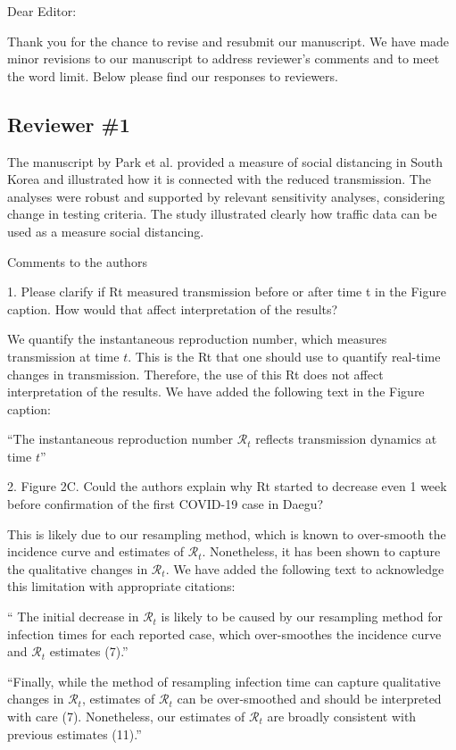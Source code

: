 \documentclass[12pt]{article}
\newcommand{\rev}{\subsection*}
\newcommand{\revtext}{\textsf}
\begin{document}
\noindent Dear Editor:

Thank you for the chance to revise and resubmit our manuscript. 
We have made minor revisions to our manuscript to address reviewer's comments and to meet the word limit.
Below please find our responses to reviewers.

\rev{Reviewer \#1}

\revtext{The manuscript by Park et al. provided a measure of social distancing in South Korea and illustrated how it is connected with the reduced transmission. The analyses were robust and supported by relevant sensitivity analyses, considering change in testing criteria. The study illustrated clearly how traffic data can be used as a measure social distancing.}

\revtext{Comments to the authors}

\revtext{1.	Please clarify if Rt measured transmission before or after time t in the Figure caption. How would that affect interpretation of the results?}

We quantify the instantaneous reproduction number, which measures transmission at time $t$. This is the Rt that one should use to quantify real-time changes in transmission. Therefore, the use of this Rt does not affect interpretation of the results. We have added the following text in the Figure caption:

``The instantaneous reproduction number $\mathcal R_t$ reflects transmission dynamics at time $t$''

\revtext{2.	Figure 2C. Could the authors explain why Rt started to decrease even 1 week before confirmation of the first COVID-19 case in Daegu? }

This is likely due to our resampling method, which is known to over-smooth the incidence curve and estimates of $\mathcal R_t$. Nonetheless, it has been shown to capture the qualitative changes in $\mathcal R_t$. We have added the following text to acknowledge this limitation with appropriate citations:

`` The initial decrease in $\mathcal R_t$ is likely to be caused by our resampling method for infection times for each reported case, which over-smoothes the incidence curve and $\mathcal R_t$ estimates (7).''

``Finally, while the method of resampling infection time can capture qualitative changes in $\mathcal R_t$, estimates of $\mathcal R_t$ can be over-smoothed and should be interpreted with care (7). Nonetheless, our estimates of $\mathcal R_t$ are broadly consistent with previous estimates (11).''
\end{document}
